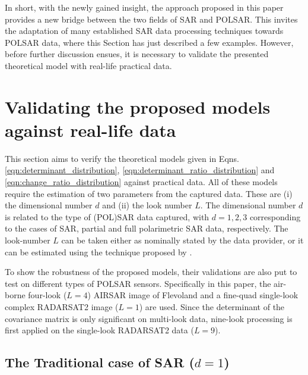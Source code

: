 \documentclass[journal]{IEEEtran}
\begin{document}
In short, with the newly gained insight,
  the approach proposed in this paper provides a new bridge between the two fields of SAR and POLSAR.
This invites the adaptation of many established SAR data processing techniques towards POLSAR data,
  where this Section has just described a few examples.
However, before further discussion ensues, 
  it is necessary to validate the presented theoretical model with real-life practical data.

\section{Validating the proposed models against real-life data}
\label{sec:polsar_models_validation}

This section aims to verify the theoretical models given in Eqns. \ref{eqn:determinant_distribution}, \ref{eqn:determinant_ratio_distribution} and \ref{eqn:change_ratio_distribution} against practical data.
All of these models require the estimation of two parameters from the captured data.
These are (i) the dimensional number $d$ and (ii) the look number $L$.
The dimensional number $d$ is related to the type of (POL)SAR data captured,
  with $d=1,2,3$ corresponding to the cases of SAR, partial and full polarimetric SAR data, respectively.
The look-number $L$ can be taken either as nominally stated by the data provider,
  or it can be estimated using the technique proposed by \cite{Anfinsen_2009_TGRS_3795}.

To show the robustness of the proposed models, 
  their validations are also put to test on different types of POLSAR sensors.
Specifically in this paper, the air-borne four-look ($L=4$) AIRSAR image of Flevoland and
  a fine-quad single-look complex RADARSAT2 image ($L=1$) are used.
Since the determinant of the covariance matrix is only significant on multi-look data,
  nine-look processing is first applied on the single-look RADARSAT2 data ($L=9$).

\subsection{The Traditional case of SAR ($d=1$)}
\end{document}
